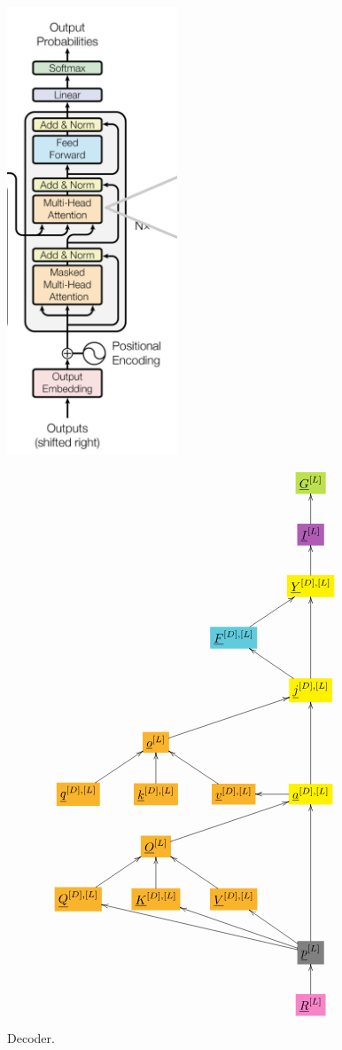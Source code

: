 \documentclass[12pt]{article}
\begin{document}
\begin{figure}[h!]\centering
\begin{minipage}{.5\linewidth}
\includegraphics[width=2in]{decoder.jpg}
\end{minipage}%
\begin{minipage}{.5\linewidth}
$$\xymatrix{
&&&*+[F*:SpringGreen]{\underline{G}^{[L]}}
\\
&&&*+[F*:Orchid]{\underline{I}^{[L]}}\ar[u]
\\
&&&*+[F*:yellow]{\underline{Y}^{[D], [L]}}\ar[u]
\\
&&*+[F*:SkyBlue]{\underline{F}^{[D], [L]}}\ar[ur]&
\\
&&&*+[F*:yellow]{\underline{j}^{[D], [L]}}\ar[uu]\ar[ul]
\\
&*+[F*:Dandelion]{\underline{o}^{[L]}}\ar[urr]&&
\\
*+[F*:Dandelion]{\underline{q}^{[D], [L]}}\ar[ur]&*+[F*:Dandelion]{\underline{k}^{[D], [L]}}\ar[u]&*+[F*:Dandelion]{\underline{v}^{[D], [L]}}\ar[ul]&*+[F*:yellow]{\underline{a}^{[D], [L]}}\ar[uu]\ar[l]
\\
&*+[F*:Dandelion]{\underline{O}^{[L]}}\ar[urr]&&
\\
*+[F*:Dandelion]{\underline{Q}^{[D], [L]}}\ar[ur]&*+[F*:Dandelion]{\underline{K}^{[D], [L]}}\ar[u]&*+[F*:Dandelion]{\underline{V}^{[D], [L]}}\ar[ul]&
\\
&&&*+[F*:gray]{\underline{p}^{[L]}}\ar[uuu]\ar[ulll]\ar[ull]\ar[ul]
\\
&&&*+[F*:Lavender]{\underline{R}^{[L]}}\ar[u]
}$$
\end{minipage}
\caption{Decoder.}
\label{fig-texnn-for-decoder}
\end{figure}
\end{document}

